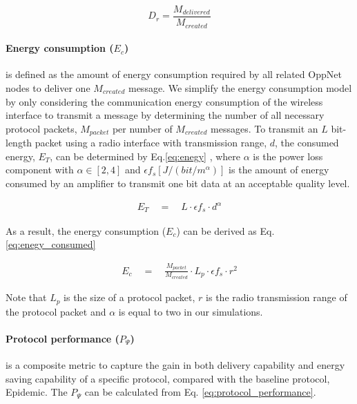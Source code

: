 \documentclass[conference]{IEEEtran}
\begin{document}
	\begin{equation}
	\label{delivery_ratio}
	D_{r} =\frac { { M }_{ delivered } }{ { M }_{ created } } 
	\end{equation}

\paragraph{Energy consumption ($E_{c}$)} 
is defined as the amount of energy consumption required by all related OppNet nodes to deliver one $M_{created}$ message.
%
We simplify the energy consumption model by only considering the communication energy consumption of the wireless interface to transmit a message by determining the number of all necessary protocol packets, $M_{packet}$ per number of $M_{created}$ messages.
To transmit an $L$ bit-length packet using a radio interface with transmission range, $d$, the consumed energy, ${ E }_{ T }$, can be determined by Eq.\ref{eq:enegy} \cite{Yang2010, Wang2006}, where $\alpha$ is the power loss component with $\alpha \in \left[ 2,4 \right]$ and $\epsilon { f }_{ s }\left[ J/(bit/{ m }^{ \alpha  }) \right]$ is the amount of energy consumed by an amplifier to transmit one bit data at an acceptable quality level.

\begin{eqnarray}
	\label{eq:enegy}
	{ E }_{ T }\quad =\quad L\cdot  { \epsilon  }{ f_s } \cdot  { d }^{ \alpha  }
\end{eqnarray} 

As a result, the energy consumption ($E_c$) can be derived as Eq. \ref{eq:enegy_consumed} 

\begin{eqnarray}
	\label{eq:enegy_consumed}
	{ E }_{ c }\quad =\quad \frac{M_{packet}}{M_{created}} \cdot L_p \cdot  { \epsilon  }{ f_s } \cdot  { r }^{ 2 }
\end{eqnarray} 

Note that $L_p$ is the size of a protocol packet, $r$ is the radio transmission range of the protocol packet and $\alpha$ is equal to two in our simulations.
\paragraph{Protocol performance ($P_{\Psi}$)} is a composite metric to capture the gain in both delivery capability and energy saving capability of a specific protocol, compared with the baseline protocol, Epidemic.
The $P_{\Psi}$ can be calculated from Eq. \ref{eq:protocol_performance}.
\end{document}
